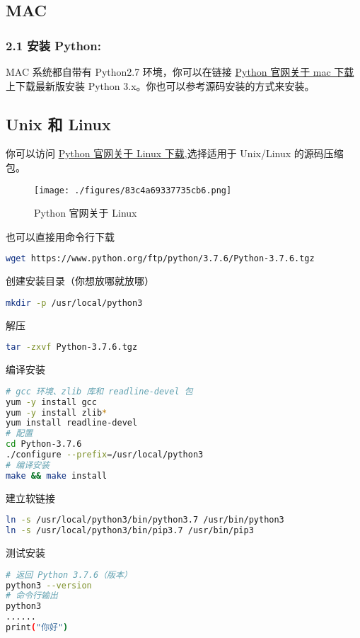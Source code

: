 \subsection{MAC}\label{sub_Pyc1_2}

\subsubsection{2.1 安装 Python:}
MAC 系统都自带有 Python2.7 环境，你可以在链接 \href{https://www.python.org/downloads/mac-osx/}{Python 官网关于 mac 下载} 上下载最新版安装 Python 3.x。你也可以参考源码安装的方式来安装。

\subsection{Unix 和 Linux} 

你可以访问 \href{https://www.python.org/downloads/source/}{Python 官网关于 Linux 下载},选择适用于 Unix/Linux 的源码压缩包。
\begin{figure}[ht]
\centering
\texttt{[image: ./figures/83c4a69337735cb6.png]}
\caption{Python 官网关于 Linux} \label{fig_Python_2}
\end{figure}

也可以直接用命令行下载
\begin{lstlisting}[language=bash]
wget https://www.python.org/ftp/python/3.7.6/Python-3.7.6.tgz
\end{lstlisting}

创建安装目录（你想放哪就放哪）
\begin{lstlisting}[language=bash]
mkdir -p /usr/local/python3
\end{lstlisting}

解压
\begin{lstlisting}[language=bash]
tar -zxvf Python-3.7.6.tgz
\end{lstlisting}

编译安装
\begin{lstlisting}[language=bash]
# gcc 环境、zlib 库和 readline-devel 包
yum -y install gcc
yum -y install zlib*
yum install readline-devel
# 配置
cd Python-3.7.6
./configure --prefix=/usr/local/python3
# 编译安装
make && make install
\end{lstlisting}

建立软链接
\begin{lstlisting}[language=bash]
ln -s /usr/local/python3/bin/python3.7 /usr/bin/python3
ln -s /usr/local/python3/bin/pip3.7 /usr/bin/pip3
\end{lstlisting}

测试安装
\begin{lstlisting}[language=bash]
# 返回 Python 3.7.6（版本）
python3 --version
# 命令行输出
python3
......
print("你好")
\end{lstlisting}






